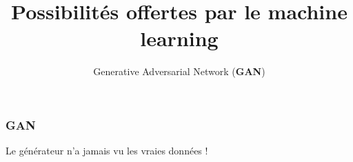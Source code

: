 \documentclass{formation}
\title{Possibilités offertes par le machine learning}
\subtitle{Generative Adversarial Network (\textbf{GAN})}
\begin{document}
\maketitle

\begin{frame}
  \frametitle{GAN}
  Le générateur n'a jamais vu les vraies données !
\end{frame}
\end{document}
